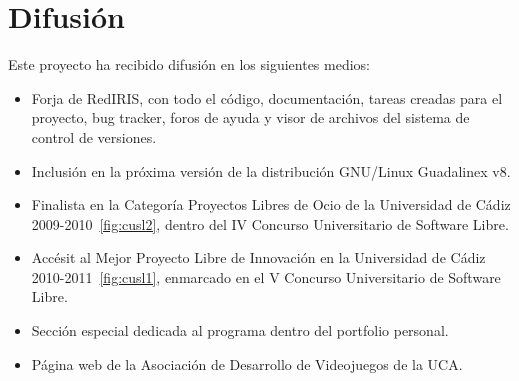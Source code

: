 

\section{Difusión}

Este proyecto ha recibido difusión en los siguientes medios:
\begin{itemize}
    \item Forja de RedIRIS, con todo el código, documentación, tareas creadas para el proyecto, bug tracker, foros de ayuda y
            visor de archivos del sistema de control de versiones.
    \item Inclusión en la próxima versión de la distribución GNU/Linux Guadalinex v8.
    \item Finalista en la Categoría Proyectos Libres de Ocio de la Universidad de Cádiz 2009-2010~\ref{fig:cusl2}, dentro del IV
            Concurso Universitario de Software Libre.
    \item Accésit al Mejor Proyecto Libre de Innovación en la Universidad de Cádiz 2010-2011~\ref{fig:cusl1}, enmarcado en el V
            Concurso Universitario de Software Libre.
    \item Sección especial dedicada al programa dentro del portfolio personal.
    \item Página web de la Asociación de Desarrollo de Videojuegos de la UCA.
\end{itemize}
